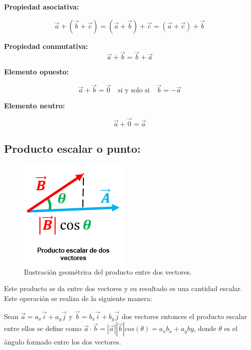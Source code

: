 \documentclass[a5paper,pagesize,10pt,bibtotoc,pointlessnumbers,
normalheadings,DIV=9,fleqn,x11names,table,twoside=false]{scrbook}
\begin{document}
\textbf{Propiedad asociativa:}

\begin{equation}
 \vec{a} + (\vec{b} + \vec{c}) = (\vec{a} + \vec{b}) + \vec{c} = (\vec{a} + \vec{c}) +\vec{b} 
 \end{equation}

\textbf{Propiedad conmutativa:}
\begin{equation}
 \vec{a} + \vec{b} = \vec{b} + \vec{a}
\end{equation}

\textbf{Elemento opuesto:}

\begin{equation}
 \vec{a} + \vec{b} = \vec{0} \quad \text{si y solo si}\quad \vec{b} =-\vec{a} 
\end{equation}

\textbf{Elemento neutro:}

\begin{equation}
 \vec{a} + \vec{0} = \vec{a} 
\end{equation}

\subsection{Producto escalar o punto:}

\begin{figure}[ht]
 \centering
 \includegraphics[scale=0.7]{images/productoescalar.png}
 \caption{Ilustración geométrica del producto entre dos vectores.}
 \label{fig:escalar}
\end{figure}

Este producto se da entre dos vectores y su resultado es una cantidad escalar. Este operación se realiza de la 
siguiente manera:

\begin{tcolorbox}
Sean $\vec{a} =a_x\vec{i}+a_y\vec{j}$ y $\vec{b}=b_x\vec{i}+b_y\vec{j}$ dos vectores entonces el producto escalar 
entre ellos se define como $\vec{a}\cdot\vec{b}=|\vec{a}||\vec{b}|cos(\theta)= a_xb_x+a_yby$, donde $\theta$ es el 
ángulo formado entre los dos vectores.
\end{tcolorbox}
\end{document}
